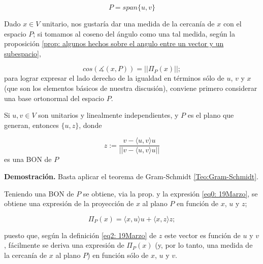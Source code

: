\[
P= span \{ u, v \}
\]

Dado $x \in V$ unitario, nos gustaría dar una medida
de la cercanía de $x$ con el espacio $P$; si tomamos
al coseno del ángulo como una tal medida, según la proposición
\ref{prop: algunos hechos sobre el angulo entre un vector y un subespacio},

\begin{equation}
\label{eq0: 19Marzo}
cos \left( \measuredangle (x, P) \right) = || \Pi_{P}(x) ||;
\end{equation}
para lograr expresar el lado derecho de la igualdad en términos
sólo de $u$, $v$ y $x$ (que son los elementos básicos de
nuestra discusión), conviene primero considerar una base
ortonormal del espacio $P$.


\begin{obs}
Si $u, v \in V$ son unitarios y linealmente independientes, y $P$
es el plano que generan, entonces
$\{ u, z \}$, donde

\begin{equation}
\label{eq2: 19Marzo}
z:= \frac{v- \langle u, v \rangle u}{||v- \langle u, v \rangle u||}
\end{equation}
es una BON de $P$
\end{obs}
\noindent
\textbf{Demostración.}
Basta aplicar el teorema de Gram-Schmidt 
\ref{Teo:Gram-Schmidt}.
\QEDB
\vspace{0.2cm}

Teniendo una BON de $P$ se obtiene, via la prop.
y la expresión \eqref{eq0: 19Marzo},
se obtiene una expresión de la proyección de $x$ al plano $P$ en función
de $x$, $u$ y $z$;

\begin{equation}
\label{eq1: 19Marzo}
\Pi_{P}(x)= \langle x, u \rangle u + \langle x, z \rangle z;
\end{equation}

puesto que, según la definición \eqref{eq2: 19Marzo} de 
$z$ este vector es función de $u$ y $v$, fácilmente se
deriva una expresión de $\Pi_{P}(x)$ (y, por lo tanto, una
medida de la cercanía de $x$ al plano $P$) en función sólo
de $x$, $u$ y $v$.

